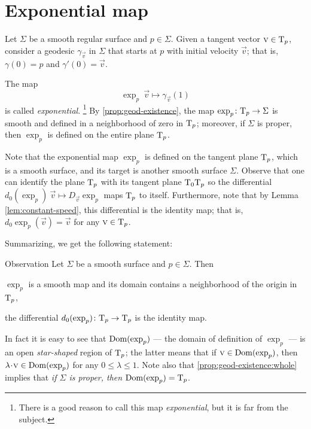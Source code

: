 \section{Exponential map}\label{sec:exp}

Let $\Sigma$ be a smooth regular surface and $p\in \Sigma$.
Given a tangent vector ${\text{\sc{v}}}\in \mathrm{T}_p$, consider a geodesic $\gamma_{\vec v}$ in $\Sigma$ that starts at $p$ with initial velocity ${\vec v}$;  
that is, $\gamma(0)=p$ and $\gamma'(0)={\vec v}$.

The map 
\[\exp_p\:\vec v\mapsto \gamma_{\vec v}(1)\]
is called \emph{exponential}.%
\footnote{There is a good reason to call this map {}\emph{exponential}, but it is far from the subject.}
By \ref{prop:geod-existence}, the map $\exp_p\colon\mathrm{T}_p\to \Sigma$ is smooth and defined in a neighborhood of zero in $\mathrm{T}_p$;
moreover, if $\Sigma$ is proper, then $\exp_p$ is defined on the entire plane $\mathrm{T}_p$.

Note that the exponential map $\exp_p$ 
is defined on the tangent plane $\mathrm{T}_p$, which is a smooth surface,
and its target is another smooth surface $\Sigma$.
Observe that one can identify the plane $\mathrm{T}_p$
with its tangent plane $\mathrm{T}_0\mathrm{T}_p$ so the differential $d_0(\exp_p)\:\vec v\mapsto D_{\vec v}\exp_p$ maps $\mathrm{T}_p$ to itself.
Furthermore,  note that by Lemma \ref{lem:constant-speed}, this differential is the identity map; that is, $d_0\exp_p(\vec v)=
\vec v$ for any $\text{\sc{v}}\in \mathrm{T}_p$.

Summarizing, we get the following statement:

\begin{thm}{Observation}\label{obs:d(exp)=1}
Let $\Sigma$ be a smooth surface and $p\in \Sigma$.
Then 
\begin{subthm}{}
$\exp_p$ is a smooth map and its domain contains a neighborhood of the origin in $\mathrm{T}_p$, 
\end{subthm}

\begin{subthm}{}
the differential $d_0(\exp_p)\colon\mathrm{T}_p\to \mathrm{T}_p$ is the identity map.
\end{subthm}

\end{thm}

In fact it is easy to see that $\mathop{\rm Dom}\nolimits(\exp_p)$ --- the domain of definition of $\exp_p$ --- is an open \emph{star-shaped} region of $\mathrm{T}_p$;
the latter means that if $\text{\sc{v}}\in \mathop{\rm Dom}\nolimits(\exp_p)$, then $\lambda\cdot\vec v\in \Dom(\exp_p)$ for any $0\le \lambda\le 1$.
Note also that \ref{prop:geod-existence:whole} implies that \emph{if $\Sigma$ is proper, then $\mathop{\rm Dom}\nolimits(\exp_p)=\mathrm{T}_p$}.


